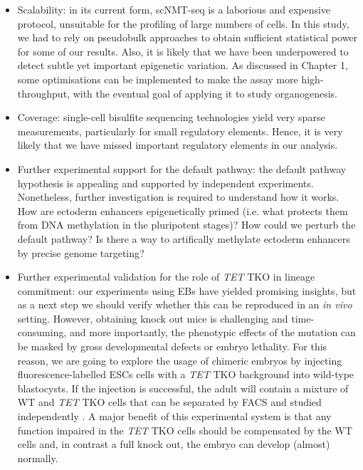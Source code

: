 \begin{itemize}
	\item Scalability: in its current form, scNMT-seq is a laborious and expensive protocol, unsuitable for the profiling of large numbers of cells. In this study, we had to rely on pseudobulk approaches to obtain sufficient statistical power for some of our results. Also, it is likely that we have been underpowered to detect subtle yet important epigenetic variation. As discussed in Chapter 1, some optimisations can be implemented to make the assay more high-throughput, with the eventual goal of applying it to study organogenesis.

	\item Coverage: single-cell bisulfite sequencing technologies yield very sparse measurements, particularly for small regulatory elements. Hence, it is very likely that we have missed important regulatory elements in our analysis.

	\item Further experimental support for the default pathway: the default pathway hypothesis is appealing and supported by independent experiments. Nonetheless, further investigation is required to understand how it works. How are ectoderm enhancers epigenetically primed (i.e. what protects them from DNA methylation in the pluripotent stages)? How could we perturb the default pathway? Is there a way to artifically methylate ectoderm enhancers by precise genome targeting?

	\item Further experimental validation for the role of \textit{TET} TKO in lineage commitment: our experiments using EBs have yielded promising insights, but as a next step we should verify whether this can be reproduced in an \textit{in vivo} setting. However, obtaining knock out mice is challenging and time-consuming, and more importantly, the phenotypic effects of the mutation can be masked by gross developmental defects or embryo lethality. For this reason, we are going to explore the usage of chimeric embryos by injecting fluorescence-labelled ESCs cells with a \textit{TET} TKO background into wild-type blastocysts. If the injection is successful, the adult will contain a mixture of WT and \textit{TET} TKO cells that can be separated by FACS and studied independently \cite{Pijuan-Sala2019}. A major benefit of this experimental system is that any function impaired in the \textit{TET} TKO cells should be compensated by the WT cells and, in contrast a full knock out, the embryo can develop (almost) normally.
	

\end{itemize}
